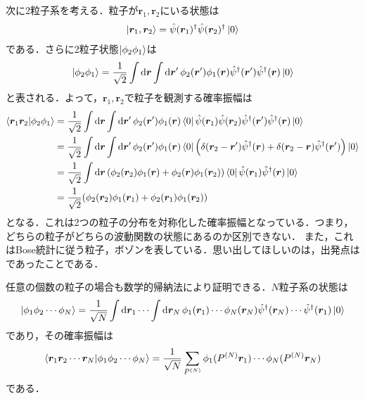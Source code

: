 \documentclass{report}
\begin{document}
次に2粒子系を考える．粒子が$\bm{r}_1,\bm{r}_2$にいる状態は
\begin{align}
  \ket{\bm{r}_1,\bm{r}_2} = \hat{\psi}(\bm{r}_1)^{\dagger}\hat{\psi}(\bm{r}_2)^{\dagger}\ket{0}
\end{align}
である．さらに2粒子状態$\ket{\phi_2\phi_1}$は
\begin{align}
  \ket{\phi_2\phi_1} = \frac{1}{\sqrt{2}}\int\dd{\bm{r}}\int\dd{\bm{r}'} \phi_2(\bm{r}')\phi_1(\bm{r}) \hat{\psi}^{\dagger}(\bm{r}')\hat{\psi}^{\dagger}(\bm{r}) \ket{0}
\end{align}
と表される．よって，$\bm{r}_1,\bm{r}_2$で粒子を観測する確率振幅は
\begin{align}
  \bra{\bm{r}_1\bm{r}_2}\ket{\phi_2\phi_1} &= \frac{1}{\sqrt{2}}\int\dd{\bm{r}}\int\dd{\bm{r}'}\phi_2(\bm{r}')\phi_1(\bm{r})\bra{0}\hat{\psi}(\bm{r}_1)\hat{\psi}(\bm{r}_2)\hat{\psi}^{\dagger}(\bm{r}')\hat{\psi}^{\dagger}(\bm{r}) \ket{0}\\
  &= \frac{1}{\sqrt{2}}\int\dd{\bm{r}}\int\dd{\bm{r}'}\phi_2(\bm{r}')\phi_1(\bm{r})\bra{0}\qty(\delta(\bm{r}_2 - \bm{r}')\hat{\psi}^{\dagger}(\bm{r}) + \delta(\bm{r}_2 - \bm{r})\hat{\psi}^{\dagger}(\bm{r}')) \ket{0}\\
  &= \frac{1}{\sqrt{2}}\int\dd{\bm{r}}\qty(\phi_2(\bm{r}_2)\phi_1(\bm{r}) + \phi_2(\bm{r})\phi_1(\bm{r}_2))\bra{0}\hat{\psi}(\bm{r}_1)\hat{\psi}^{\dagger}(\bm{r})\ket{0}\\
  &= \frac{1}{\sqrt{2}}\qty(\phi_2(\bm{r}_2)\phi_1(\bm{r}_1) + \phi_2(\bm{r}_1)\phi_1(\bm{r}_2))
\end{align}
となる．これは2つの粒子の分布を対称化した確率振幅となっている．つまり，どちらの粒子がどちらの波動関数の状態にあるのか区別できない．
また，これはBose統計に従う粒子，ボゾンを表している．思い出してほしいのは，出発点はであったことである．

任意の個数の粒子の場合も数学的帰納法により証明できる．$N$粒子系の状態は
\begin{align}
  \ket{\phi_1\phi_2\cdots\phi_N} = \frac{1}{\sqrt{N}}\int\dd{\bm{r}_1}\cdots\int\dd{\bm{r}_N}\phi_1(\bm{r}_1)\cdots\phi_N(\bm{r}_N)\hat{\psi}^{\dagger}(\bm{r}_N)\cdots\hat{\psi}^{\dagger}(\bm{r}_1)\ket{0}
\end{align}
であり，その確率振幅は
\begin{align}
  \bra{\bm{r}_1\bm{r}_2\cdots\bm{r}_N}\ket{\phi_1\phi_2\cdots\phi_N} = \frac{1}{\sqrt{N}}\sum_{P^{(N)}} \phi_1(P^{(N)}\bm{r}_1)\cdots\phi_{N}(P^{(N)}\bm{r}_N)
\end{align}
である．
\end{document}
